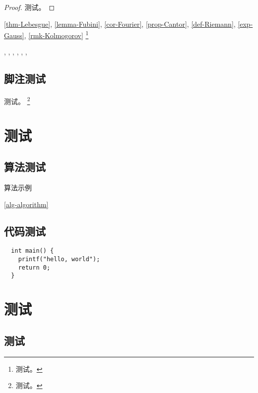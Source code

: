 \documentclass{sysuthesis}
\begin{document}
\begin{proof}
  测试。
\end{proof}

\autoref{thm-Lebesgue}, \autoref{lemma-Fubini}, \autoref{cor-Fourier}, \autoref{prop-Cantor}, \autoref{def-Riemann}, \autoref{exp-Gauss}, \autoref{rmk-Kolmogorov} \footnote{测试。}

, , , , , , 

\newpage

\section{脚注测试}

测试。 \footnote{测试。}

\chapter{测试}
\section{算法测试}

\begin{algorithm}
  \caption{算法示例}
  \label{alg-algorithm}
\end{algorithm}

\autoref{alg-algorithm}

\section{代码测试}

\begin{verbatim}
  int main() {
    printf("hello, world");
    return 0;
  }
\end{verbatim}

\appendix

\chapter{测试}
\section{测试}
\end{document}
